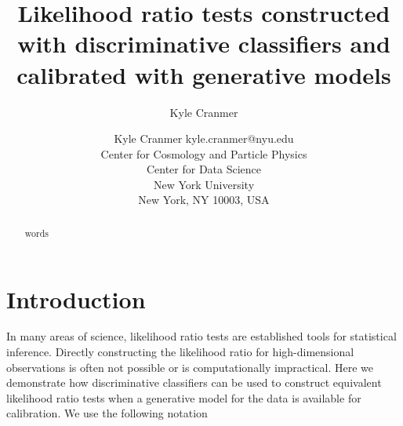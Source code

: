 \documentclass[11pt, oneside]{article}   	%
\title{Likelihood ratio tests constructed with discriminative classifiers and calibrated with generative models}
\author{Kyle Cranmer}
\begin{document}
\author{\name Kyle Cranmer \email kyle.cranmer@nyu.edu \\
       \addr Center for Cosmology and Particle Physics\\
       Center for Data Science\\
       New York University \\
       New York, NY 10003, USA
}

\editor{}

\maketitle

\begin{abstract}%
words
\end{abstract}
%




\maketitle

\section{Introduction}


In many areas of science, likelihood ratio tests  are established tools for statistical inference. 
Directly constructing the likelihood ratio for high-dimensional observations 
is often not possible or is computationally impractical. Here we demonstrate how 
discriminative classifiers can be used to construct equivalent likelihood ratio tests when 
a generative model for the data is available for calibration.  We use the following notation
\end{document}
